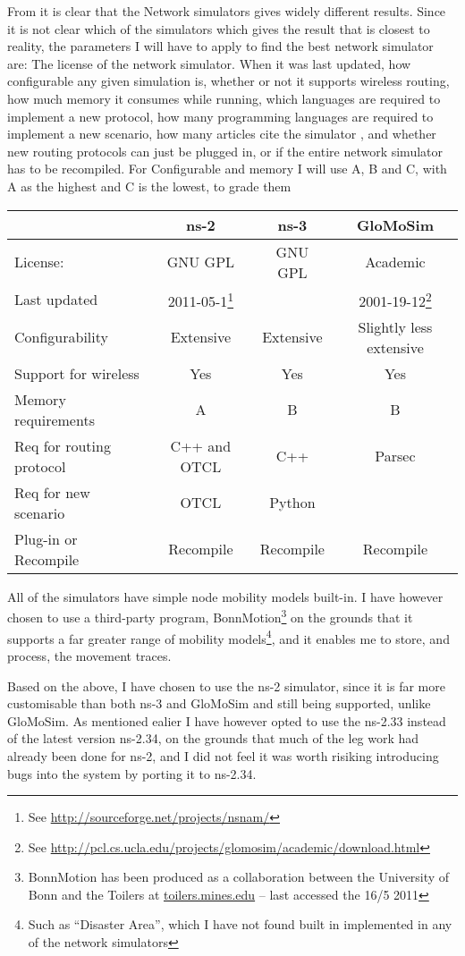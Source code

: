 From \cite{MANcom} it is clear that the Network simulators gives widely different results. Since it is not clear which of the simulators which gives the result that is closest to reality, the parameters I will have to apply to find the best network simulator are: The license of the network simulator. When it was last updated, how configurable any given simulation is, whether or not it supports wireless routing, how much memory it consumes while running, which languages are required to implement a new protocol, how many programming languages are required to implement a new scenario, how many articles cite the simulator , and whether new routing protocols can just be plugged in, or if the entire network simulator has to be recompiled. For Configurable and memory I will use A, B and C, with A as the highest and C is the lowest, to grade them\\
\begin{scriptsize}
\begin{minipage}{15.0cm}
\begin{tabular}[4]{lccc}
                          & ns-2      & ns-3      & GloMoSim  \\
\hline
License:                  & GNU GPL   & GNU GPL   & Academic  \\
Last updated              & 2011-05-1\footnote{See \url{http://sourceforge.net/projects/nsnam/}} & & 2001-19-12\footnote{See \url{http://pcl.cs.ucla.edu/projects/glomosim/academic/download.html}}\\
Configurability           & Extensive & Extensive & Slightly less extensive \\
Support for wireless      & Yes       & Yes       & Yes \\
Memory requirements       & A         & B         & B   \\
Req for routing protocol  & C++ and OTCL & C++    & Parsec \\
Req for new scenario      & OTCL      & Python    & \\
Plug-in or Recompile      & Recompile & Recompile & Recompile
\end{tabular}
\end{minipage}
\end{scriptsize}

All of the simulators have simple node mobility models built-in. I have however chosen to use a third-party program, BonnMotion\footnote{BonnMotion has been produced as a collaboration between the University of Bonn and the Toilers at \url{toilers.mines.edu} -- last accessed the 16/5 2011} on the grounds that it supports a far greater range of mobility models\footnote{Such as ``Disaster Area'', which I have not found built in implemented in any of the network simulators}, and it enables me to store, and process, the movement traces.

Based on the above, I have chosen to use the ns-2 simulator, since it is far more customisable than both ns-3 and GloMoSim and still being supported, unlike GloMoSim. As mentioned ealier I have however opted to use the ns-2.33 instead of the latest version ns-2.34, on the grounds that much of the leg work had already been done for ns-2, and I did not feel it was worth risiking introducing bugs into the system by porting it to ns-2.34.

